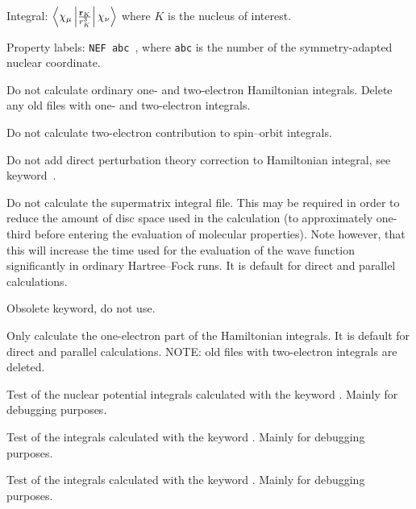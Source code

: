 \begin{description}
\begin{list}{}{}
\item Integral:
$\left<\chi_{\mu}\left|\frac{{\bf r}_K}{r_{K}^3}\right|\chi_{\nu}\right>$
where $K$ is the nucleus of interest.
\item Property labels: \verb|NEF abc |, where \verb|abc| is the number
of the symmetry-adapted nuclear coordinate.
\end{list}

\item[\Key{NO HAM}] Do not calculate ordinary one- and two-electron
  Hamiltonian integrals. Delete any old files with one- and two-electron integrals.

\item[\Key{NO2SO}] Do not calculate two-electron contribution to
  spin--orbit integrals.

\item[\Key{NOPICH}] Do not add direct perturbation theory correction
  to Hamiltonian integral, see keyword~.

\item[\Key{NOSUP}] Do not calculate the supermatrix
integral file.
This may be required in order to reduce the amount of disc space used
in the calculation (to approximately one-third before entering the
evaluation of molecular properties).
Note however, that this will increase the time used for the evaluation
of the wave function
significantly in ordinary Hartree--Fock runs. It is default for direct and
parallel calculations.

\item[\Key{NOTV12}] Obsolete keyword, do not use.

\item[\Key{NOTWO}] Only calculate the one-electron part of the
Hamiltonian integrals. It is default for direct and parallel calculations.
NOTE: old files with two-electron integrals are deleted.

\item[\Key{NPOTST}] Test of the nuclear potential integrals
calculated with the keyword . Mainly for debugging
purposes.

\item[\Key{NSLTST}] Test of the integrals calculated with the
keyword . Mainly for debugging purposes.

\item[\Key{NSNLTS}] Test of the integrals calculated with the
keyword . Mainly for debugging purposes.


\end{description}
